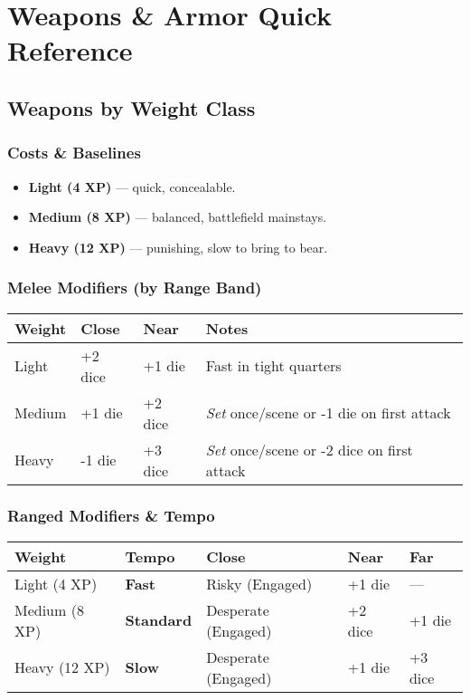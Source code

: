 \chapter{Weapons \& Armor Quick Reference}
\label{app:weapons-armor}

\section{Weapons by Weight Class}
\label{app:weapons-weight}

\subsection*{Costs \& Baselines}
\begin{itemize}
  \item \textbf{Light (4 XP)} — quick, concealable.
  \item \textbf{Medium (8 XP)} — balanced, battlefield mainstays.
  \item \textbf{Heavy (12 XP)} — punishing, slow to bring to bear.
\end{itemize}

\subsection*{Melee Modifiers (by Range Band)}
\begin{center}
\begin{tabular}{llll}
\toprule
\textbf{Weight} & \textbf{Close} & \textbf{Near} & \textbf{Notes} \\
\midrule
Light & +2 dice & +1 die & Fast in tight quarters \\
Medium & +1 die & +2 dice & \emph{Set} once/scene or -1 die on first attack \\
Heavy & -1 die  & +3 dice & \emph{Set} once/scene or -2 dice on first attack \\
\bottomrule
\end{tabular}
\end{center}

\subsection*{Ranged Modifiers \& Tempo}
\label{app:ranged-tempo}
\begin{center}
\begin{tabular}{lllll}
\toprule
\textbf{Weight} & \textbf{Tempo} & \textbf{Close} & \textbf{Near} & \textbf{Far} \\
\midrule
Light (4 XP) & \textbf{Fast} & Risky (Engaged) & +1 die & — \\
Medium (8 XP) & \textbf{Standard} & Desperate (Engaged) & +2 dice & +1 die \\
Heavy (12 XP) & \textbf{Slow} & Desperate (Engaged) & +1 die & +3 dice \\
\bottomrule
\end{tabular}
\end{center}

